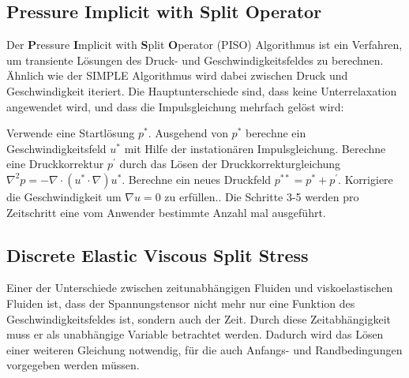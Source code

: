 \subsection{Pressure Implicit with Split Operator}
Der \textbf{P}ressure \textbf{I}mplicit with \textbf{S}plit \textbf{O}perator (PISO) \cite{cfd} Algorithmus ist ein Verfahren, um transiente Lösungen des Druck- und Geschwindigkeitsfeldes zu berechnen.
Ähnlich wie der \mbox{SIMPLE} Algorithmus wird dabei zwischen Druck und Ge\-schwin\-dig\-keit iteriert. Die Hauptunterschiede sind, dass keine Unterrelaxation angewendet wird, und dass die Impulsgleichung mehrfach gelöst wird:
%
\begin{outline}[enumerate]
    \1 Verwende eine Startlösung $p^*$.
    \1 Ausgehend von $p^*$ berechne ein Geschwindigkeitsfeld $u^*$ mit Hilfe der instationären Impulsgleichung.
    \1 Berechne eine Druckkorrektur $p^{'}$ durch das Lösen der Druckkorrekturgleichung $\nabla^2p=-\nabla \cdot \left( u^*\cdot\nabla \right)u^*$.
    \1 Berechne ein neues Druckfeld $p^{**}=p^*+ p^{'}$.
    \1 Korrigiere die Geschwindigkeit um $\nabla u=0$ zu erfüllen..
    \1 Die Schritte 3-5 werden pro Zeitschritt eine vom Anwender bestimmte Anzahl mal ausgeführt.
\end{outline}
%
\subsection{Discrete Elastic Viscous Split Stress}
Einer der Unterschiede zwischen zeitunabhängigen Fluiden und viskoelastischen Fluiden ist, dass der Spannungstensor nicht mehr nur eine Funktion des Geschwindigkeitsfeldes ist, sondern auch der Zeit. Durch diese Zeitabhängigkeit muss er als unabhängige Variable betrachtet werden. Dadurch wird das Lösen einer weiteren Gleichung notwendig, für die auch Anfangs- und Randbedingungen vorgegeben werden müssen. 

